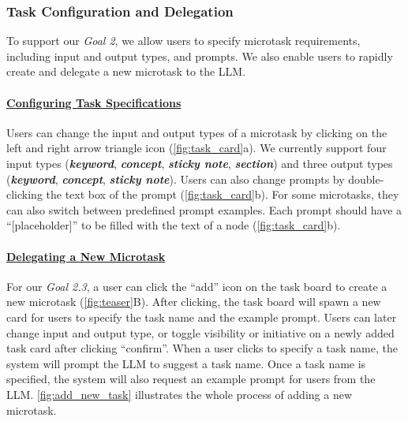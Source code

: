 \subsubsection{Task Configuration and Delegation}
To support our \textit{Goal 2}, we allow users to specify microtask requirements, including input and output types, and prompts.
We also enable users to rapidly create and delegate a new microtask to the LLM.

\paragraph{\underline{Configuring Task Specifications}} \label{task_configuration}
Users can change the input and output types of a microtask by clicking on the left and right arrow triangle icon (\autoref{fig:task_card}a). We currently support four input types (\textbf{\textcolor{keyword}{\textit{keyword}}}, \textbf{\textcolor{concept}{\textit{concept}}}, \textbf{\textcolor{sticky_note}{\textit{sticky note}}}, \textbf{\textcolor{section}{\textit{section}}}) and three output types (\textbf{\textcolor{keyword}{\textit{keyword}}}, \textbf{\textcolor{concept}{\textit{concept}}}, \textbf{\textcolor{sticky_note}{\textit{sticky note}}}). Users can also change prompts by double-clicking the text box of the prompt (\autoref{fig:task_card}b). For some microtasks, they can also switch between predefined prompt examples. Each prompt should have a ``[placeholder]'' to be filled with the text of a node (\autoref{fig:task_card}b).

\paragraph{\underline{Delegating a New Microtask}}
For our \textit{Goal 2.3}, a user can click the ``add'' icon on the task board to create a new microtask (\autoref{fig:teaser}B). After clicking, the task board will spawn a new card for users to specify the task name and the example prompt. Users can later change input and output type, or toggle visibility or initiative on a newly added task card after clicking ``confirm''. When a user clicks to specify a task name, the system will prompt the LLM to suggest a task name. Once a task name is specified, the system will also request an example prompt for users from the LLM. \autoref{fig:add_new_task} illustrates the whole process of adding a new microtask.



